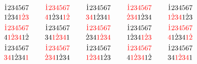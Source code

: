 \[ \SeqCompare{\dot{1}234567}{1\dot{2}34\textcolor{red}{1}\textcolor{red}{\dot{2}}\textcolor{red}{3}}
\qquad
\SeqCompare{\textcolor{red}{\dot{1}}\textcolor{red}{2}\textcolor{red}{3}\textcolor{red}{4}\textcolor{red}{5}\textcolor{red}{6}\textcolor{red}{7}}{\textcolor{red}{4}1\dot{2}34\textcolor{red}{1}\textcolor{red}{\dot{2}}}
\qquad
\SeqCompare{\dot{1}234567}{\textcolor{red}{3}\textcolor{red}{4}1\dot{2}34\textcolor{red}{1}}
\qquad
\SeqCompare{\textcolor{red}{\dot{1}}\textcolor{red}{2}\textcolor{red}{3}\textcolor{red}{4}\textcolor{red}{5}\textcolor{red}{6}\textcolor{red}{7}}{\textcolor{red}{\dot{2}}\textcolor{red}{3}\textcolor{red}{4}1\dot{2}34}
\qquad
\SeqCompare{\dot{1}234567}{\textcolor{red}{1}\textcolor{red}{\dot{2}}\textcolor{red}{3}\textcolor{red}{4}1\dot{2}3} \]
\[ \SeqCompare{\textcolor{red}{\dot{1}}\textcolor{red}{2}\textcolor{red}{3}\textcolor{red}{4}\textcolor{red}{5}\textcolor{red}{6}\textcolor{red}{7}}{4\textcolor{red}{1}\textcolor{red}{\dot{2}}\textcolor{red}{3}\textcolor{red}{4}1\dot{2}}
\qquad
\SeqCompare{\dot{1}234567}{34\textcolor{red}{1}\textcolor{red}{\dot{2}}\textcolor{red}{3}\textcolor{red}{4}1}
\qquad
\SeqCompare{\textcolor{red}{\dot{1}}\textcolor{red}{2}\textcolor{red}{3}\textcolor{red}{4}\textcolor{red}{5}\textcolor{red}{6}\textcolor{red}{7}}{\dot{2}34\textcolor{red}{1}\textcolor{red}{\dot{2}}\textcolor{red}{3}\textcolor{red}{4}}
\qquad
\SeqCompare{\dot{1}234567}{1\dot{2}34\textcolor{red}{1}\textcolor{red}{\dot{2}}\textcolor{red}{3}}
\qquad
\SeqCompare{\textcolor{red}{\dot{1}}\textcolor{red}{2}\textcolor{red}{3}\textcolor{red}{4}\textcolor{red}{5}\textcolor{red}{6}\textcolor{red}{7}}{\textcolor{red}{4}1\dot{2}34\textcolor{red}{1}\textcolor{red}{\dot{2}}} \]
\[ \SeqCompare{\dot{1}234567}{\textcolor{red}{3}\textcolor{red}{4}1\dot{2}34\textcolor{red}{1}}
\qquad
\SeqCompare{\textcolor{red}{\dot{1}}\textcolor{red}{2}\textcolor{red}{3}\textcolor{red}{4}\textcolor{red}{5}\textcolor{red}{6}\textcolor{red}{7}}{\textcolor{red}{\dot{2}}\textcolor{red}{3}\textcolor{red}{4}1\dot{2}34}
\qquad
\SeqCompare{\dot{1}234567}{\textcolor{red}{1}\textcolor{red}{\dot{2}}\textcolor{red}{3}\textcolor{red}{4}1\dot{2}3}
\qquad
\SeqCompare{\textcolor{red}{\dot{1}}\textcolor{red}{2}\textcolor{red}{3}\textcolor{red}{4}\textcolor{red}{5}\textcolor{red}{6}\textcolor{red}{7}}{4\textcolor{red}{1}\textcolor{red}{\dot{2}}\textcolor{red}{3}\textcolor{red}{4}1\dot{2}}
\qquad
\SeqCompare{\dot{1}234567}{34\textcolor{red}{1}\textcolor{red}{\dot{2}}\textcolor{red}{3}\textcolor{red}{4}1} \]
